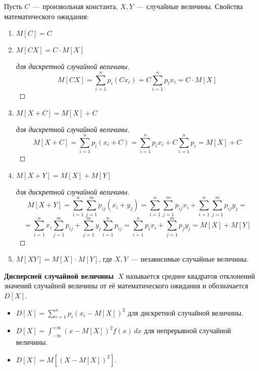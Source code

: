Пусть $C$~--- произвольная константа, $X, Y$~--- случайные величины.
Свойства математического ожидания:
\begin{enumerate}
	\item $M[C] = C$
	
	\item $M[CX] = C \cdot M[X]$
	\begin{proof}[для дискретной случайной величины]
	\begin{equation*}
	M[CX] =
	\sum_{i=1}^n p_i (C x_i) =
	C \sum_{i=1}^n p_i x_i =
	C \cdot M[X]
	\end{equation*}
	\end{proof}
	
	\item $M[X + C] = M[X] + C$
	\begin{proof}[для дискретной случайной величины]
	\begin{equation*}
	M[X + C] =
	\sum_{i=1}^n p_i (x_i + C) =
	\sum_{i=1}^n p_i x_i + C \sum_{i=1}^n p_i =
	M[X] + C
	\end{equation*}
	\end{proof}
	
	\item $M[X + Y] = M[X] + M[Y]$
	\begin{proof}[для дискретной случайной величины]
	\begin{equation*}
	M[X + Y] =
	\sum_{i=1}^n \sum_{j=1}^m p_{ij} (x_i + y_j) =
	\sum_{i=1}^n \sum_{j=1}^m p_{ij} x_i + \sum_{i=1}^n \sum_{j=1}^m p_{ij} y_j =
	\end{equation*}
	\begin{equation*}
	= \sum_{i=1}^n x_i \sum_{j=1}^m p_{ij} + \sum_{j=1}^m y_j \sum_{i=1}^n p_{ij} =
	\sum_{i=1}^n p_i x_i + \sum_{j=1}^m p_j y_j =
	M[X] + M[Y]
	\end{equation*}
	\end{proof}
	
	\item $M[XY] = M[X] \cdot M[Y]$, где $X, Y$~--- независимые случайные величины.
\end{enumerate}

 \textbf{Дисперсией случайной величины~$X$} называется среднее квадратов отклонений значений случайной величины от её математического ожидания и обозначается $D[X]$.
\begin{itemize}
	\item $\displaystyle D[X] = \sum_{i=1}^n p_i (x_i - M[X])^2$ для дискретной случайной величины.
	\item $\displaystyle D[X] = \int_{-\infty}^{+\infty} (x - M[X])^2 f(x)\,dx$ для непрерывной случайной величины.
	\item $\displaystyle D[X] = M\left[(X - M[X])^2\right]$.
\end{itemize}

